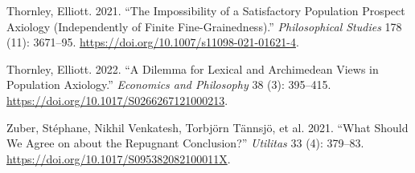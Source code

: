 \documentclass[
  11pt,
  letterpaper,
  DIV=11,
  numbers=noendperiod,
  twoside]{scrartcl}
\newlength{\cslhangindent}
\newenvironment{CSLReferences}[2] %
 {\begin{list}{}{%
  \setlength{\itemindent}{0pt}
  \setlength{\leftmargin}{0pt}
  \setlength{\parsep}{0pt}
  \ifodd #1
   \setlength{\leftmargin}{\cslhangindent}
   \setlength{\itemindent}{-1\cslhangindent}
  \fi
  \setlength{\itemsep}{#2\baselineskip}}}
 {\end{list}}
\begin{document}
\begin{CSLReferences}{1}{1}
Thornley, Elliott. 2021. {``The Impossibility of a Satisfactory
Population Prospect Axiology (Independently of {F}inite
{F}ine-{G}rainedness).''} \emph{Philosophical Studies} 178 (11):
3671--95. \url{https://doi.org/10.1007/s11098-021-01621-4}.

Thornley, Elliott. 2022. {``A Dilemma for Lexical and {A}rchimedean
Views in Population Axiology.''} \emph{Economics and Philosophy} 38 (3):
395--415. \url{https://doi.org/10.1017/S0266267121000213}.

Zuber, Stéphane, Nikhil Venkatesh, Torbjörn Tännsjö, et al. 2021.
{``What Should We Agree on about the Repugnant Conclusion?''}
\emph{Utilitas} 33 (4): 379--83.
\url{https://doi.org/10.1017/S095382082100011X}.

\end{CSLReferences}
\end{document}
